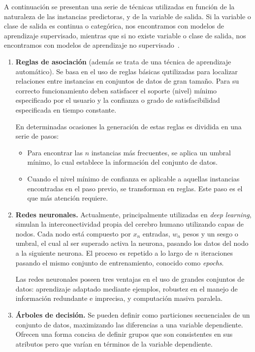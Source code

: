 A continuación se presentan una serie de técnicas utilizadas en función de la naturaleza de las instancias predictoras, y de la variable de salida. Si la variable o clase de salida es continua o categórica, nos encontramos con modelos de aprendizaje supervisado, mientras que si no existe variable o clase de salida, nos encontramos con modelos de aprendizaje no supervisado~\cite{palmer2011data}.

\begin{enumerate}
	\item \textbf{Reglas de asociación} (además se trata de una técnica de aprendizaje automático). Se basa en el uso de reglas básicas qutilizadas para localizar relaciones entre instancias en conjuntos de datos de gran tamaño. Para su correcto funcionamiento deben satisfacer el soporte (nivel) mínimo especificado por el usuario y la confianza o grado de satisfacibilidad especificada en tiempo constante.
	
	En determinadas ocasiones la generación de estas reglas es dividida en una serie de pasos:
	\begin{itemize}
	\item Para encontrar las $n$ instancias más frecuentes, se aplica un umbral mínimo, lo cual establece la información del conjunto de datos.
	\item Cuando el nivel mínimo de confianza es aplicable a aquellas instancias encontradas en el paso previo, se transforman en reglas. Este paso es el que más atención requiere.
	\end{itemize}
	\item \textbf{Redes neuronales.} Actualmente, principalmente utilizadas en \textit{deep learning}, simulan la interconectividad propia del cerebro humano utilizando capas de nodos. Cada nodo está compuesto por \(x_n\) entradas, \(w_n\) pesos y un sesgo o umbral, el cual al ser superado activa la neurona, pasando los datos del nodo a la siguiente neurona. El proceso es repetido a lo largo de $n$ iteraciones pasando el mismo conjunto de entrenamiento, conocido como \textit{epochs}.
	
	Las redes neuronales poseen tres ventajas en el uso de grandes conjuntos de datos: aprendizaje adaptado mediante ejemplos, robustez en el manejo de información redundante e imprecisa, y computación masiva paralela.
	\item \textbf{Árboles de decisión.} Se pueden definir como particiones secuenciales de un conjunto de datos, maximizando las diferencias a una variable dependiente. Ofrecen una forma concisa de definir grupos que son consistentes en sus atributos pero que varían en términos de la variable dependiente.
	

\end{enumerate}
